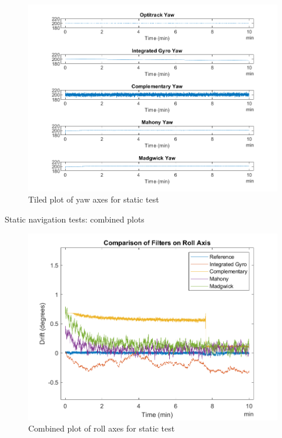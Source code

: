 \begin{figure}[H]
    \centering
    \includegraphics[scale=1]{graphics/Navigation/TiledStaticYaw.png}
    \caption{Tiled plot of yaw axes for static test}
     \label{fig:Tiled plot of filters yaw axes for static test}
\end{figure}

Static navigation tests: combined plots

\begin{figure}[H]
    \centering
    \includegraphics[scale=1]{graphics/Navigation/CombinedStaticRoll.png}
    \caption{Combined plot of roll axes for static test}
     \label{fig:Combined plot of roll axes for static test}
\end{figure}


